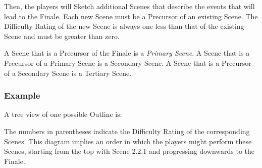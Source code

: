 \documentclass[12pt, a5paper, parskip=half-]{scrartcl}
\begin{document}
Then, the players will Sketch additional Scenes that describe the events that will lead to the Finale.
Each new Scene must be a Precursor of an existing Scene.
The Difficulty Rating of the new Scene is always one less than that of the existing Scene and must be greater than zero.

A Scene that is a Precursor of the Finale is a \emph{Primary Scene}.
A Scene that is a Precursor of a Primary Scene is a {Secondary Scene}.
A Scene that is a Precursor of a Secondary Scene is a {Tertiary Scene}.

%

\newpage
\subsubsection*{Example}
A tree view of one possible Outline is:
\smallskip
\begin{center}
\end{center}

\bigskip

The numbers in parentheses indicate the Difficulty Rating of the corresponding Scenes. This diagram implies an order in which the players might perform these Scenes, starting from the top with Scene 2.2.1 and progressing downwards to the Finale.
\end{document}
